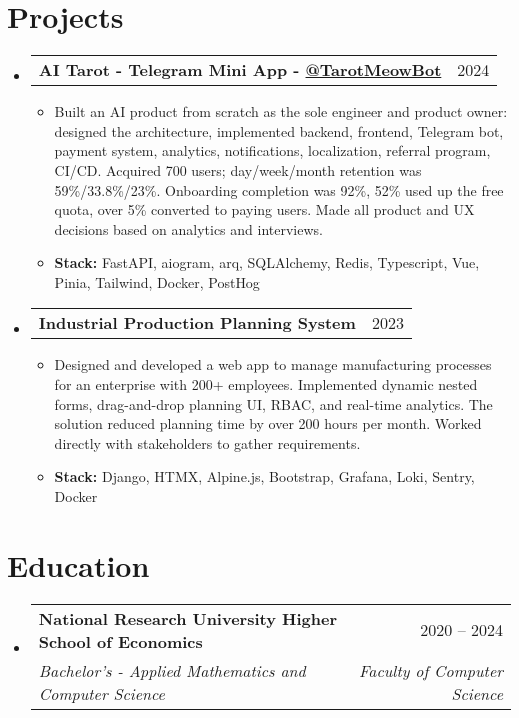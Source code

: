\documentclass[letterpaper,11pt]{article}
\makeatletter
\newcommand{\resumeSubheading}[4]{
  \vspace{-1pt}\item
    \begin{tabular*}{0.97\textwidth}[t]{l@{\extracolsep{\fill}}r}
      \textbf{#1} & #2 \\
      \textit{\small#3} & \textit{\small #4} \\
    \end{tabular*}\vspace{-8pt}
}
\newcommand{\resumeProjectHeading}[2]{
    \item
    \begin{tabular*}{0.97\textwidth}{l@{\extracolsep{\fill}}r}
      \small#1 & #2 \\
    \end{tabular*}\vspace{-8pt}
}
\newcommand{\resumeSubHeadingListStart}{\begin{itemize}[leftmargin=0.15in, label={}]}
\newcommand{\resumeSubHeadingListEnd}{\end{itemize}}
\makeatother
\begin{document}
\section{Projects}
    \resumeSubHeadingListStart
    \resumeProjectHeading
        {\textbf{AI Tarot - Telegram Mini App - \href{https://t.me/tarotmeowbot/app?startapp=r-resume}{@TarotMeowBot}}}{2024}
        \small\vspace{-10pt}\begin{itemize}[leftmargin=0.15in, label={}]
        \item{Built an AI product from scratch as the sole engineer and product owner: designed the architecture, implemented backend, frontend, Telegram bot, payment system, analytics, notifications, localization, referral program, CI/CD. Acquired 700 users; day/week/month retention was 59\%/33.8\%/23\%. Onboarding completion was 92\%, 52\% used up the free quota, over 5\% converted to paying users. Made all product and UX decisions based on analytics and interviews.}
        \end{itemize}
        \small\vspace{-14pt}\begin{itemize}[leftmargin=0.15in, label={}]
        \item{\textbf{Stack:} FastAPI, aiogram, arq, SQLAlchemy, Redis, Typescript, Vue, Pinia, Tailwind, Docker, PostHog}
        \end{itemize}

    \vspace{-8pt}
    \resumeProjectHeading
        {\textbf{Industrial Production Planning System}}{2023}
        \small\vspace{-10pt}\begin{itemize}[leftmargin=0.15in, label={}]
        \item{Designed and developed a web app to manage manufacturing processes for an enterprise with 200+ employees. Implemented dynamic nested forms, drag-and-drop planning UI, RBAC, and real-time analytics. The solution reduced planning time by over 200 hours per month. Worked directly with stakeholders to gather requirements.}
        \end{itemize}
        \small\vspace{-14pt}\begin{itemize}[leftmargin=0.15in, label={}]
        \item{\textbf{Stack:} Django, HTMX, Alpine.js, Bootstrap, Grafana, Loki, Sentry, Docker}
        \end{itemize}
    \resumeSubHeadingListEnd

\section{Education}
  \resumeSubHeadingListStart
    \resumeSubheading
      {National Research University Higher School of Economics}{2020 -- 2024}
      {Bachelor's - Applied Mathematics and Computer Science}{Faculty of Computer Science}
  \resumeSubHeadingListEnd
\end{document}
